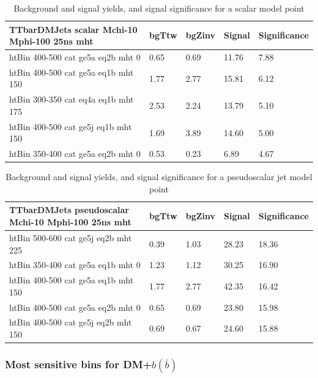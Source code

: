 \begin{table}
\small
\begin{center}
\caption{Background and signal yields, and signal significance for a scalar \DMtt model point}
\label{tab:MSB_DMttS_2fb}
\begin{tabular}{|l|l|l|l|l|}
\textbf{TTbarDMJets scalar Mchi-10 Mphi-100 25ns mht}    &  bgTtw    &  bgZinv   &  Signal &     Significance \\ 
\hline
htBin 400-500 cat ge5a eq2b mht 0 &     0.65     &  0.69     &  11.76   &7.88 \\ 
htBin 400-500 cat ge5a eq1b mht 150 &   1.77     &  2.77     &  15.81   &6.12 \\ 
htBin 300-350 cat eq4a eq1b mht 175 &   2.53     &  2.24     &  13.79   &5.10 \\ 
htBin 400-500 cat ge5j eq1b mht 150 &   1.69     &  3.89     &  14.60   &5.00 \\ 
htBin 350-400 cat ge5a eq2b mht 0 &     0.53     &  0.23     &  6.89    &4.67 \\ 
\end{tabular}
\end{center}
\end{table}

\begin{table}
\small
\begin{center}
\caption{Background and signal yields, and signal significance for a pseudoscalar \DMtt jet model point}
\label{tab:MSB_DMttP_2fb}
\begin{tabular}{|l|l|l|l|l|}
\textbf{TTbarDMJets pseudoscalar Mchi-10 Mphi-100 25ns mht}  &  bgTtw    &  bgZinv   &  Signal &     Significance \\ 
\hline
htBin 500-600 cat ge5j eq2b mht 225 &   0.39     &  1.03     &  28.23   &18.36 \\ 
htBin 350-400 cat ge5a eq1b mht 0 &     1.23     &  1.12     &  30.25   &16.90 \\ 
htBin 400-500 cat ge5a eq1b mht 150 &   1.77     &  2.77     &  42.35   &16.42 \\ 
htBin 400-500 cat ge5a eq2b mht 0 &     0.65     &  0.69     &  23.80   &15.98 \\ 
htBin 400-500 cat ge5j eq2b mht 150 &   0.69     &  0.67     &  24.60   &15.88 \\ 
\end{tabular}
\end{center}
\end{table}



\subsubsection{Most sensitive bins for DM+$b(\bar{b})$}
